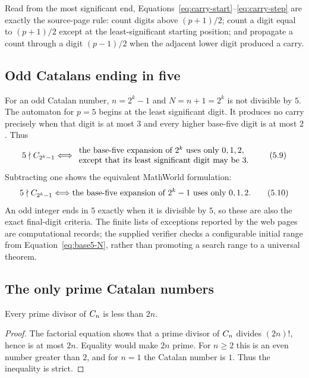 Read from the most significant end, Equations~\eqref{eq:carry-start}--\eqref{eq:carry-step}
are exactly the source-page rule: count digits above $(p+1)/2$; count a digit
equal to $(p+1)/2$ except at the least-significant starting position; and
propagate a count through a digit $(p-1)/2$ when the adjacent lower digit
produced a carry.

\subsection{Odd Catalans ending in five}

For an odd Catalan number, $n=2^k-1$ and $N=n+1=2^k$ is not divisible by $5$.
The automaton for $p=5$ begins at the least significant digit.  It produces no
carry precisely when that digit is at most $3$ and every higher base-five
digit is at most $2$.  Thus
\[
 5\nmid C_{2^k-1}
 \Longleftrightarrow
 \begin{array}{l}
 \text{the base-five expansion of }2^k\text{ uses only }0,1,2,\\
 \text{except that its least significant digit may be }3.
 \end{array}                                                     \tag{5.9}\label{eq:base5-N}
\]
Subtracting one shows the equivalent MathWorld formulation:
\[
 5\nmid C_{2^k-1}
 \Longleftrightarrow
 \text{the base-five expansion of }2^k-1\text{ uses only }0,1,2. \tag{5.10}\label{eq:base5-n}
\]
An odd integer ends in $5$ exactly when it is divisible by $5$, so these are
also the exact final-digit criteria.  The finite lists of exceptions reported
by the web pages are computational records; the supplied verifier checks a
configurable initial range from Equation~\eqref{eq:base5-N}, rather than
promoting a search range to a universal theorem.

\subsection{The only prime Catalan numbers}

\begin{lemma}
Every prime divisor of $C_n$ is less than $2n$.
\end{lemma}

\begin{proof}
The factorial equation shows that a prime divisor of $C_n$ divides
$(2n)!$, hence is at most $2n$.  Equality would make $2n$ prime.  For $n\ge2$
this is an even number greater than $2$, and for $n=1$ the Catalan number is
$1$.  Thus the inequality is strict.
\end{proof}


